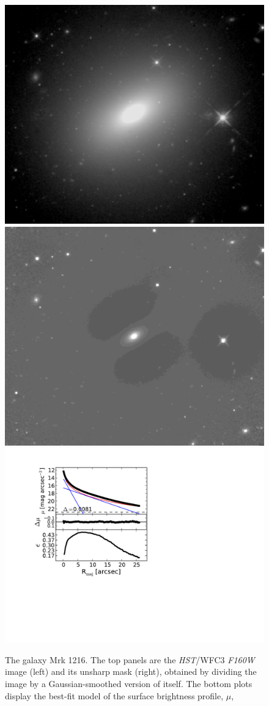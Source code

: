 \documentclass[useAMS,usenatbib,article]{mn2e}
\begin{document}
\begin{figure}
\begin{center}
\includegraphics[width=0.49\columnwidth]{images/mrk1216_image.jpeg}
\includegraphics[width=0.49\columnwidth]{images/mrk1216_unsharp.jpeg} \\
\includegraphics[width=1.05\columnwidth]{images/mrk1216_decomposition.pdf}
\caption{The galaxy Mrk 1216. 
The top panels are the \emph{HST}/WFC3 \emph{F160W} image (left) and its unsharp mask (right), 
obtained by dividing the image by a Gaussian-smoothed version of itself. 
The bottom plots display the best-fit model of the surface brightness profile, $\mu$, 
}
\end{center}
\end{figure}
\end{document}
